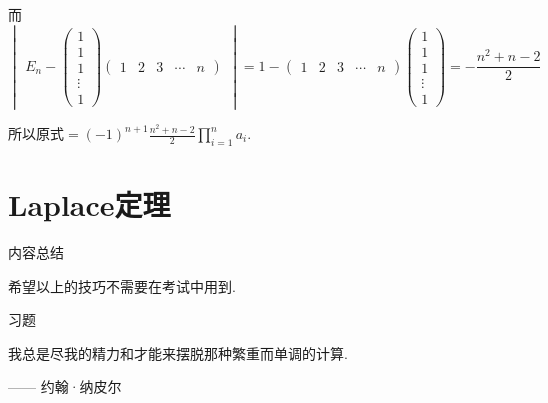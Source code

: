 \begin{solution}
    而 \[ \begin{vmatrix}E_n-\begin{pmatrix}
                1 \\1\\1\\\vdots\\1
            \end{pmatrix}\begin{pmatrix}1 & 2 & 3 & \cdots & n\end{pmatrix}\end{vmatrix}
        =1-\begin{pmatrix}1 & 2 & 3 & \cdots & n\end{pmatrix}
        \begin{pmatrix}1 \\ 1 \\ 1 \\ \vdots \\ 1\end{pmatrix}
        =-\frac{n^2+n-2}{2} \]

    所以原式$\displaystyle =(-1)^{n+1}\frac{n^2+n-2}{2}\prod_{i=1}^na_i$.
\end{solution}

\section{Laplace定理}

\vspace{2ex}
\centerline{\heiti \Large 内容总结}

希望以上的技巧不需要在考试中用到.

\vspace{2ex}
\centerline{\heiti \Large 习题}

\vspace{2ex}
{\kaishu 我总是尽我的精力和才能来摆脱那种繁重而单调的计算. }
\begin{flushright}
    \kaishu
    —— 约翰·纳皮尔
\end{flushright}

